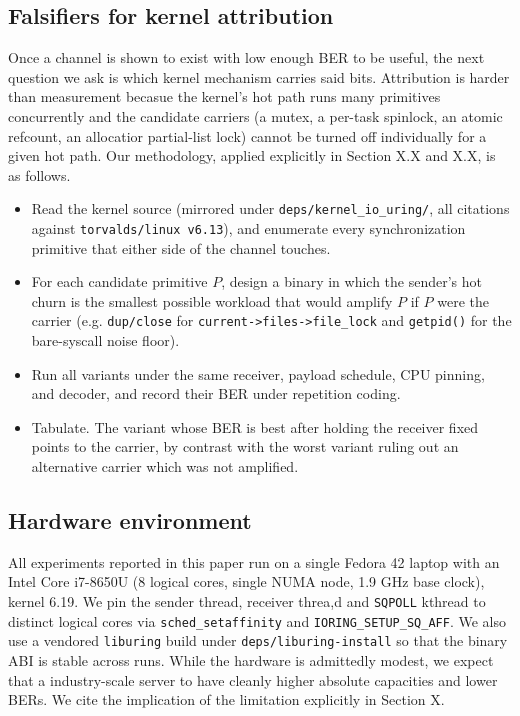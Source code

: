 \documentclass[letterpaper,twocolumn,10pt]{article}
\newcommand{\code}[1]{\texttt{#1}}
\begin{document}
\subsection{Falsifiers for kernel attribution}
Once a channel is shown to exist with low enough BER to be useful, the next question we ask is which kernel mechanism carries said bits. Attribution is harder than measurement becasue the kernel's hot path runs many primitives concurrently and the candidate carriers (a mutex, a per-task spinlock, an atomic refcount, an allocatior partial-list lock) cannot be turned off individually for a given hot path. Our methodology, applied explicitly in Section X.X and X.X, is as follows.
\begin{itemize}
    \item Read the kernel source (mirrored under \code{deps/kernel\_io\_uring/}, all citations against \code{torvalds/linux v6.13}), and enumerate every synchronization primitive that either side of the channel touches.
    \item For each candidate primitive $P$, design a binary in which the sender's hot churn is the smallest possible workload that would amplify $P$ if $P$ were the carrier (e.g. \code{dup/close} for \code{current->files->file\_lock} and \code{getpid()} for the bare-syscall noise floor).
    \item Run all variants under the same receiver, payload schedule, CPU pinning, and decoder, and record their BER under repetition coding.
    \item Tabulate. The variant whose BER is best after holding the receiver fixed points to the carrier, by contrast with the worst variant ruling out an alternative carrier which was not amplified.
\end{itemize}

\subsection{Hardware environment}
All experiments reported in this paper run on a single Fedora 42 laptop with an Intel Core i7-8650U (8 logical cores, single NUMA node, 1.9 GHz base clock), kernel 6.19. We pin the sender thread, receiver threa,d and \code{SQPOLL} kthread to distinct logical cores via \code{sched\_setaffinity} and \code{IORING\_SETUP\_SQ\_AFF}. We also use a vendored \code{liburing} build under \code{deps/liburing-install} so that the binary ABI is stable across runs. While the hardware is admittedly modest, we expect that a industry-scale server to have cleanly higher absolute capacities and lower BERs. We cite the implication of the limitation explicitly in Section X. %
\end{document}
